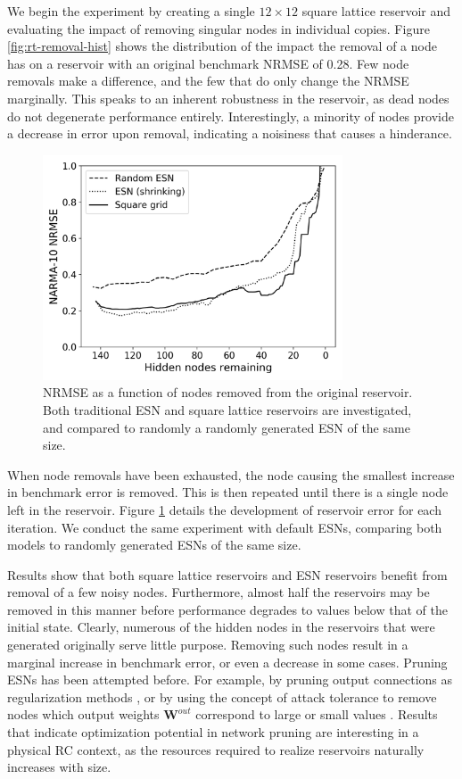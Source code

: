 We begin the experiment by creating a single $12 \times 12$ square lattice
reservoir and evaluating the impact of removing singular nodes in individual
copies. Figure \ref{fig:rt-removal-hist} shows the distribution of the impact
the removal of a node has on a reservoir with an original benchmark NRMSE of
0.28. Few node removals make a difference, and the few that do only change the
NRMSE marginally. This speaks to an inherent robustness in the reservoir, as
dead nodes do not degenerate performance entirely. Interestingly, a minority of
nodes provide a decrease in error upon removal, indicating a noisiness that
causes a hinderance.

\begin{figure}[htb]
  \centering
  \includegraphics[width=3.5in]{figures/shrink-performance.png}
  \caption{
    NRMSE as a function of nodes removed from the original reservoir. Both
traditional ESN and square lattice reservoirs are investigated, and compared to
randomly a randomly generated ESN of the same size.
  }
  \label{fig:sq-shrink-performance}
\end{figure}

When node removals have been exhausted, the node causing the smallest increase
in benchmark error is removed. This is then repeated until there is a single
node left in the reservoir. Figure \ref{fig:sq-shrink-performance} details the
development of reservoir error for each iteration. We conduct the same
experiment with default ESNs, comparing both models to randomly generated ESNs
of the same size.

Results show that both square lattice reservoirs and ESN reservoirs benefit from
removal of a few noisy nodes. Furthermore, almost half the reservoirs may be
removed in this manner before performance degrades to values below that of the
initial state. Clearly, numerous of the hidden nodes in the reservoirs that were
generated originally serve little purpose. Removing such nodes result in a
marginal increase in benchmark error, or even a decrease in some cases. Pruning
ESNs has been attempted before. For example, by pruning output connections as
regularization methods \cite{dutoit_pruning_2009}, or by using the concept of
attack tolerance to remove nodes which output weights $\mathbf{W}^{out}$
correspond to large or small values \cite{haluszczynski_reservoir_2020}. Results
that indicate optimization potential in network pruning are interesting in a
physical RC context, as the resources required to realize reservoirs naturally
increases with size.


